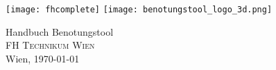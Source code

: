 



\begin{titlepage}
\begin{center}

\vfill \texttt{[image: fhcomplete]}
\vspace*{20mm}
\vfill \texttt{[image: benotungstool\_logo\_3d.png]}
\vspace*{10mm} 

\huge Handbuch Benotungstool\\

	
\large \vfill \textsc{FH Technikum Wien}\\

Wien, \today
\end{center}
\end{titlepage}
